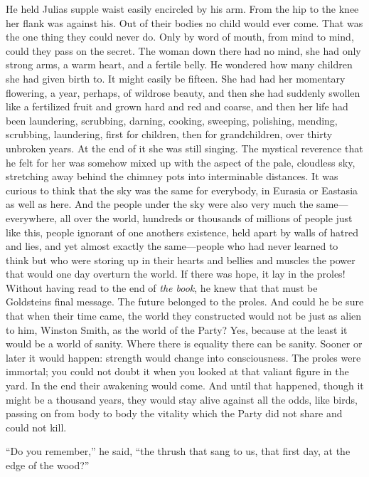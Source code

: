 He held Julia\textquotesingle s supple waist easily encircled by his
arm. From the hip to the knee her flank was against his. Out of their
bodies no child would ever come. That was the one thing they could never
do. Only by word of mouth, from mind to mind, could they pass on the
secret. The woman down there had no mind, she had only strong arms, a
warm heart, and a fertile belly. He wondered how many children she had
given birth to. It might easily be fifteen. She had had her momentary
flowering, a year, perhaps, of wildrose beauty, and then she had
suddenly swollen like a fertilized fruit and grown hard and red and
coarse, and then her life had been laundering, scrubbing, darning,
cooking, sweeping, polishing, mending, scrubbing, laundering, first for
children, then for grandchildren, over thirty unbroken years. At the end
of it she was still singing. The mystical reverence that he felt for her
was somehow mixed up with the aspect of the pale, cloudless sky,
stretching away behind the chimney pots into interminable distances. It
was curious to think that the sky was the same for everybody, in Eurasia
or Eastasia as well as here. And the people under the sky were also very
much the same---everywhere, all over the world, hundreds or thousands of
millions of people just like this, people ignorant of one
another\textquotesingle s existence, held apart by walls of hatred and
lies, and yet almost exactly the same---people who had never learned to
think but who were storing up in their hearts and bellies and muscles
the power that would one day overturn the world. If there was hope, it
lay in the proles! Without having read to the end of \emph{the book}, he
knew that that must be Goldstein\textquotesingle s final message. The
future belonged to the proles. And could he be sure that when their time
came, the world they constructed would not be just as alien to him,
Winston Smith, as the world of the Party? Yes, because at the least it
would be a world of sanity. Where there is equality there can be sanity.
Sooner or later it would happen: strength would change into
consciousness. The proles were immortal; you could not doubt it when you
looked at that valiant figure in the yard. In the end their awakening
would come. And until that happened, though it might be a thousand
years, they would stay alive against all the odds, like birds, passing
on from body to body the vitality which the Party did not share and
could not kill.

``Do you remember,'' he said, ``the thrush that sang to us, that first day,
at the edge of the wood?''

